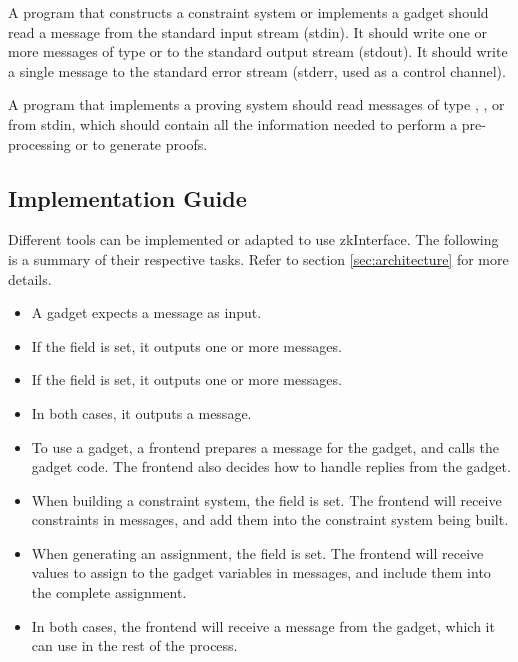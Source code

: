 A program that constructs a constraint system or implements a gadget should read a  message from the standard input stream (stdin).
It should write one or more messages of type
 or 
to the standard output stream (stdout).
It should write a single  message to the standard error stream
(stderr, used as a control channel).

A program that implements a proving system should read messages of type
, , or 
from stdin, which should contain all the information needed to perform a pre-processing or to generate proofs.


\subsection{Implementation Guide}

Different tools can be implemented or adapted to use zkInterface. The following is a summary of their respective tasks. Refer to section \ref{sec:architecture} for more details.


\begin{itemize}
    \item A gadget expects a  message as input.

    \item If the field  is set, it outputs one or more  messages.

    \item If the field  is set, it outputs one or more  messages.

    \item In both cases, it outputs a  message.
\end{itemize}


\begin{itemize}
    \item To use a gadget, a frontend prepares a  message for the gadget, and calls the gadget code. The frontend also decides how to handle replies from the gadget.

    \item When building a constraint system, the field  is set. The frontend will receive constraints in  messages, and add them into the constraint system being built.

    \item When generating an assignment, the field  is set. The frontend will receive values to assign to the gadget variables in  messages, and include them into the complete assignment.

    \item In both cases, the frontend will receive a  message from the gadget, which it can use in the rest of the process.
\end{itemize}


